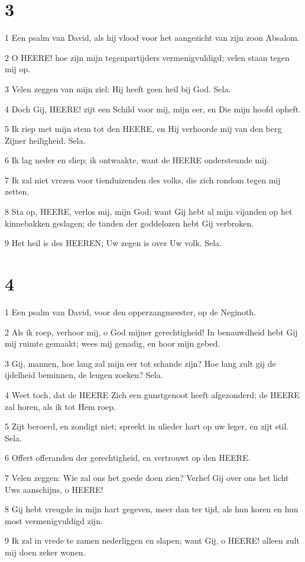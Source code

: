 \chapter{3}

\par 1 Een psalm van David, als hij vlood voor het aangezicht van zijn zoon Absalom.
\par 2 O HEERE! hoe zijn mijn tegenpartijders vermenigvuldigd; velen staan tegen mij op.
\par 3 Velen zeggen van mijn ziel: Hij heeft geen heil bij God. Sela.
\par 4 Doch Gij, HEERE! zijt een Schild voor mij, mijn eer, en Die mijn hoofd opheft.
\par 5 Ik riep met mijn stem tot den HEERE, en Hij verhoorde mij van den berg Zijner heiligheid. Sela.
\par 6 Ik lag neder en sliep; ik ontwaakte, want de HEERE ondersteunde mij.
\par 7 Ik zal niet vrezen voor tienduizenden des volks, die zich rondom tegen mij zetten.
\par 8 Sta op, HEERE, verlos mij, mijn God; want Gij hebt al mijn vijanden op het kinnebakken geslagen; de tanden der goddelozen hebt Gij verbroken.
\par 9 Het heil is des HEEREN; Uw zegen is over Uw volk. Sela.

\chapter{4}

\par 1 Een psalm van David, voor den opperzangmeester, op de Neginoth.
\par 2 Als ik roep, verhoor mij, o God mijner gerechtigheid! In benauwdheid hebt Gij mij ruimte gemaakt; wees mij genadig, en hoor mijn gebed.
\par 3 Gij, mannen, hoe lang zal mijn eer tot schande zijn? Hoe lang zult gij de ijdelheid beminnen, de leugen zoeken? Sela.
\par 4 Weet toch, dat de HEERE Zich een gunstgenoot heeft afgezonderd; de HEERE zal horen, als ik tot Hem roep.
\par 5 Zijt beroerd, en zondigt niet; spreekt in ulieder hart op uw leger, en zijt stil. Sela.
\par 6 Offert offeranden der gerechtigheid, en vertrouwt op den HEERE.
\par 7 Velen zeggen: Wie zal ons het goede doen zien? Verhef Gij over ons het licht Uws aanschijns, o HEERE!
\par 8 Gij hebt vreugde in mijn hart gegeven, meer dan ter tijd, als hun koren en hun most vermenigvuldigd zijn.
\par 9 Ik zal in vrede te zamen nederliggen en slapen; want Gij, o HEERE! alleen zult mij doen zeker wonen.

